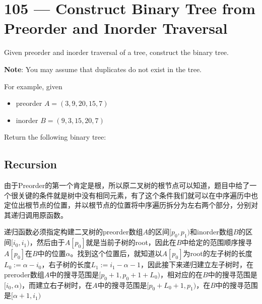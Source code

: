 \section{105 --- Construct Binary Tree from Preorder and Inorder Traversal}\label{105algo}
Given preorder and inorder traversal of a tree, construct the binary tree.
\par
\textbf{Note}: You may assume that duplicates do not exist in the tree.
\par
For example, given
\begin{itemize}
    \item preorder $A = (3,9,20,15,7)$
    \item inorder $B = (9,3,15,20,7)$
\end{itemize}
Return the following binary tree:
\begin{figure}[H]
\end{figure}
\subsection{Recursion}
\begin{CJK*}{UTF8}{gbsn}
由于Preorder的第一个肯定是根，所以原二叉树的根节点可以知道，题目中给了一个很关键的条件就是树中没有相同元素，有了这个条件我们就可以在中序遍历中也定位出根节点的位置，并以根节点的位置将中序遍历拆分为左右两个部分，分别对其递归调用原函数。
\par
递归函数必须指定构建二叉树的preorder数组$A$的区间$[p_0, p_1)$和inorder数组$B$的区间$[i_0,i_1)$，然后由于$A[p_0]$就是当前子树的root，因此在$B$中给定的范围顺序搜寻$A[p_0]$在$B$中的位置$\alpha$。找到这个位置后，就知道以$A[p_0]$为root的左子树的长度$L_0:=\alpha - i_0$，右子树的长度$L_1:=i_1 - \alpha - 1$，因此接下来递归建立左子树时，在preroder数组$A$中的搜寻范围是$[p_0+1, p_0+1+L_0)$，相对应的在$B$中的搜寻范围是$[i_0, \alpha)$，而建立右子树时，在$A$中的搜寻范围是$[p_0+L_0+1, p_1)$，在$B$中的搜寻范围是$[\alpha+1, i_1)$
\end{CJK*}
